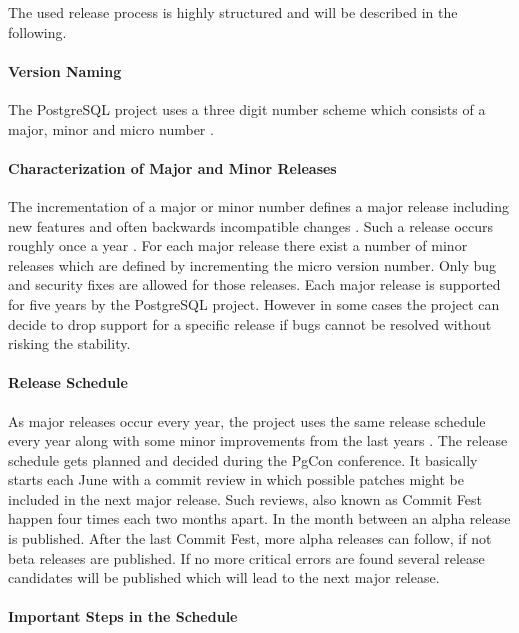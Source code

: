 The used release process is highly structured and will be described in the
following.

\paragraph{Version Naming}

The PostgreSQL project uses a three digit number scheme which consists of a
major, minor and micro number \cite{PostgreSQLVersioning}.

\paragraph{Characterization of Major and Minor Releases}

The incrementation of a major or minor number defines a major release including
new features and often backwards incompatible changes
\cite{PostgreSQLVersioning}. Such a release occurs roughly once a year
\cite{PostgreSQLDevelopment,PostgreSQLFAQ}. For each major release there exist
a number of minor releases which are defined by incrementing the micro version
number. Only bug and security fixes are allowed for those releases. Each major
release is supported for five years by the PostgreSQL project. However in some
cases the project can decide to drop support for a specific release if bugs
cannot be resolved without risking the stability.

\paragraph{Release Schedule}

As major releases occur every year, the project uses the same release schedule
every year along with some minor improvements from the last years
\cite{PostgreSQLDevelopment}. The release schedule gets planned and decided
during the PgCon conference. It basically starts each June with a commit review
in which possible patches might be included in the next major release. Such
reviews, also known as Commit Fest happen four times each two months apart. In
the month between an alpha release is published. After the last Commit Fest,
more alpha releases can follow, if not beta releases are published. If no more
critical errors are found several release candidates will be published which
will lead to the next major release.

\paragraph{Important Steps in the Schedule}

